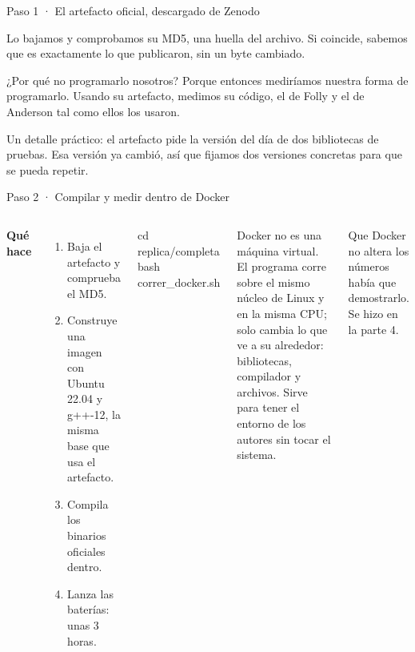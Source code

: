\begin{frame}{Paso 1 · El artefacto oficial, descargado de Zenodo}
{  Lo bajamos y comprobamos su MD5, una huella del archivo. Si coincide, sabemos que es exactamente lo que publicaron, sin un byte cambiado.

  ¿Por qué no programarlo nosotros? Porque entonces mediríamos nuestra forma de programarlo. Usando su artefacto, medimos su código, el de Folly y el de Anderson tal como ellos los usaron.

  Un detalle práctico: el artefacto pide la versión del día de dos bibliotecas de pruebas. Esa versión ya cambió, así que fijamos dos versiones concretas para que se pueda repetir.}
\end{frame}

\begin{frame}{Paso 2 · Compilar y medir dentro de Docker}
  \begin{columns}[T,onlytextwidth]
    \small
    \textbf{\color{marino}Qué hace }
    \begin{enumerate}\footnotesize
      \item Baja el artefacto y comprueba el MD5.
      \item Construye una imagen con Ubuntu 22.04 y g++-12, la misma base que usa el artefacto.
      \item Compila los binarios oficiales dentro.
      \item Lanza las baterías: unas 3 horas.
    \end{enumerate}
    \vspace{1mm}
    \begin{tcolorbox}[colback=tinta,colupper=white,boxrule=0pt,arc=1.5pt,left=4pt,top=2pt,bottom=2pt,fontupper=\scriptsize\ttfamily]
      cd replica/completa\\
      bash correr\_docker.sh
    \end{tcolorbox}
    \begin{porque}[: Docker]
      Docker no es una máquina virtual. El programa corre sobre el mismo núcleo de Linux y en la misma CPU; solo cambia lo que ve a su alrededor: bibliotecas, compilador y archivos. Sirve para tener el entorno de los autores sin tocar el sistema.
    \end{porque}
    \begin{ojo}Que Docker no altera los números había que demostrarlo. Se hizo en la parte 4.\end{ojo}
  \end{columns}
\end{frame}
